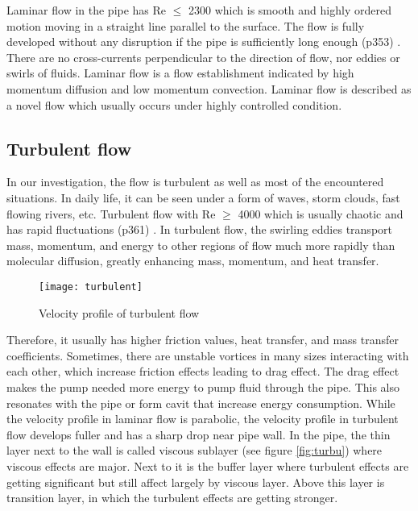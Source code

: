 Laminar flow in the pipe has Re $\leq$ 2300 which is smooth and highly ordered motion moving in a straight line parallel to the surface. The flow is fully developed without any disruption if the pipe is sufficiently long enough (p353) \cite{cengel:book}. There are no cross-currents perpendicular to the direction of flow, nor eddies or swirls of fluids. Laminar flow is a flow establishment indicated by high momentum diffusion and low momentum convection. Laminar flow is described as a novel flow which usually occurs under highly controlled condition.

\subsection{Turbulent flow}

In our investigation, the flow is turbulent as well as most of the encountered situations. In daily life, it can be seen under a form of waves, storm clouds, fast flowing rivers, etc. Turbulent flow with Re $\geq$ 4000 which is usually chaotic and has rapid fluctuations (p361) \cite{cengel:book}. In turbulent flow, the swirling eddies transport mass, momentum, and energy to other regions of flow much more rapidly than molecular diffusion, greatly enhancing mass, momentum, and heat transfer. 
\begin{wrapfigure}{r}{0.5\textwidth}
  \begin{center}
    \texttt{[image: turbulent]}
  \end{center}
  \caption{Velocity profile of turbulent flow \cite{cengel:book}}
  \label{fig:turbu}
\end{wrapfigure}
Therefore, it usually has higher friction values, heat transfer, and mass transfer coefficients. Sometimes, there are unstable vortices in many sizes interacting with each other, which increase friction effects leading to drag effect. The drag effect makes the pump needed more energy to pump fluid through the pipe. This also resonates with the pipe or form \gls{cavit} that increase energy consumption. While the velocity profile in laminar flow is parabolic, the velocity profile in turbulent flow develops fuller and has a sharp drop near pipe wall.  In the pipe, the thin layer next to the wall is called viscous sublayer (see figure \vref{fig:turbu}) where viscous effects are major. Next to it is the buffer layer where turbulent effects are getting significant but still affect largely by viscous layer. Above this layer is transition layer, in which the turbulent effects are getting stronger. 

